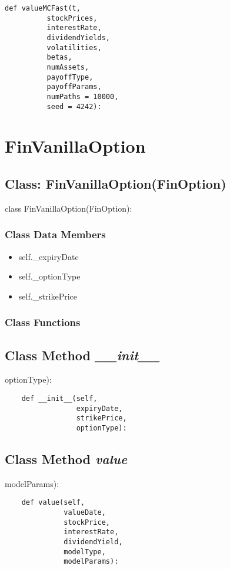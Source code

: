 \documentclass[twoside,11pt]{book}
\begin{document}
\begin{lstlisting}
def valueMCFast(t,
          stockPrices,
          interestRate,
          dividendYields,
          volatilities,
          betas,
          numAssets,
          payoffType,
          payoffParams,
          numPaths = 10000,
          seed = 4242):
\end{lstlisting}

\newpage
\section{FinVanillaOption}

\subsection{Class: FinVanillaOption(FinOption)}
class FinVanillaOption(FinOption):

\subsubsection{Class Data Members}
\begin{itemize}
\item{self.\_expiryDate}
\item{self.\_optionType}
\item{self.\_strikePrice}
\end{itemize}

\subsubsection{Class Functions}

\subsection{Class Method {\it \_\_init\_\_}}
optionType):

\begin{lstlisting}
    def __init__(self,
                 expiryDate,
                 strikePrice,
                 optionType):
\end{lstlisting}

\subsection{Class Method {\it value}}
modelParams):

\begin{lstlisting}
    def value(self,
              valueDate,
              stockPrice,
              interestRate,
              dividendYield,
              modelType,
              modelParams):
\end{lstlisting}
\end{document}
